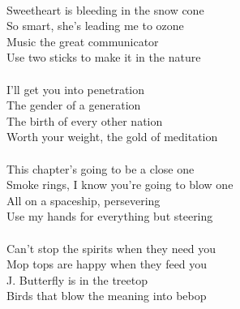 \\
Sweetheart is bleeding in the snow cone \\
So smart, she's leading me to ozone \\
Music the great communicator \\
Use two sticks to make it in the nature \\
\\
I'll get you into penetration \\
The gender of a generation \\
The birth of every other nation \\
Worth your weight, the gold of meditation \\
\\
This chapter's going to be a close one \\
Smoke rings, I know you're going to blow one \\
All on a spaceship, persevering \\
Use my hands for everything but steering \\
\\
Can't stop the spirits when they need you \\
Mop tops are happy when they feed you \\
J. Butterfly is in the treetop \\
Birds that blow the meaning into bebop \\
